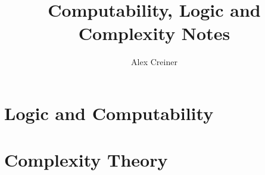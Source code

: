 \documentclass{article}
\title{Computability, Logic and Complexity Notes}
\author{Alex Creiner}
\date{}
\theoremstyle{definition}
\theoremstyle{plain}
\theoremstyle{theorem}
\begin{document}
\maketitle

\tableofcontents

\newpage
\part{Logic and Computability}








\part{Complexity Theory}








% 



\appendix



\printbibliography

\iffalse
\end{document}
